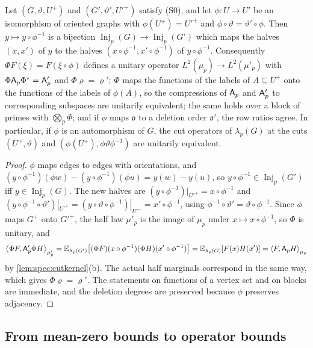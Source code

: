 \begin{lemma}\label{lem:cut-transport}
Let $(G,\vartheta,U^+)$ and $(G',\vartheta',U'^+)$ satisfy \textup{(S0)}, and
let $\phi\colon U\to U'$ be an isomorphism of oriented graphs with
$\phi(U^+)=U'^+$ and $\phi\circ\vartheta=\vartheta'\circ\phi$. Then
$y\mapsto y\circ\phi^{-1}$ is a bijection
$\operatorname{Inj}_p(G)\to\operatorname{Inj}_p(G')$ which maps the halves
$(x,x')$ of $y$ to the halves $(x\circ\phi^{-1},x'\circ\phi^{-1})$ of
$y\circ\phi^{-1}$. Consequently $\Phi F(\xi)=F(\xi\circ\phi)$ defines a
unitary operator $L^2(\mu_p)\to L^2(\mu'_p)$ with $\Phi\mathsf A_p\Phi^*=\mathsf A_p'$ and
$\Phi\varrho=\varrho'$; $\Phi$ maps the functions of the labels of
$A\subseteq U^+$ onto the functions of the labels of $\phi(A)$, so the
compressions of $\mathsf A_p$ and $\mathsf A_p'$ to corresponding subspaces are unitarily
equivalent; the same holds over a block of primes with $\bigotimes_p\Phi$; and
if $\phi$ maps $\mathfrak o$ to a deletion order $\mathfrak o'$, the row ratios
agree. In particular, if $\phi$ is an automorphism of $G$, the cut operators of
$\lambda_p(G)$ at the cuts $(U^+,\vartheta)$ and
$(\phi(U^+),\phi\vartheta\phi^{-1})$ are unitarily equivalent.
\end{lemma}

\begin{proof}
$\phi$ maps edges to edges with orientations, and
$(y\circ\phi^{-1})(\phi w)-(y\circ\phi^{-1})(\phi u)=y(w)-y(u)$, so
$y\circ\phi^{-1}\in\operatorname{Inj}_p(G')$ iff $y\in\operatorname{Inj}_p(G)$.
The new halves are $(y\circ\phi^{-1})|_{U'^+}=x\circ\phi^{-1}$ and
$(y\circ\phi^{-1}\circ\vartheta')|_{U'^+}=(y\circ\vartheta\circ\phi^{-1})|_{U'^+}
=x'\circ\phi^{-1}$, using $\phi^{-1}\circ\vartheta'=\vartheta\circ\phi^{-1}$.
Since $\phi$ maps $G^+$ onto $G'^+$, the half law $\mu'_p$ is the image of
$\mu_p$ under $x\mapsto x\circ\phi^{-1}$, so $\Phi$ is unitary, and
\[
  \left\langle \Phi F,\mathsf A_p'\Phi H\right\rangle_{\mu'_p}=\mathbb E_{\lambda_p(G')}\big[(\Phi F)(x\circ\phi^{-1})
  (\Phi H)(x'\circ\phi^{-1})\big]=\mathbb E_{\lambda_p(G)}[F(x)H(x')]=\left\langle F,\mathsf A_p H\right\rangle_{\mu_p}
\]
by \cref{lem:spec:cutkernel}(b). The actual half marginals correspond in the
same way, which gives $\Phi\varrho=\varrho'$. The statements on functions of a
vertex set and on blocks are immediate, and the deletion degrees are preserved
because $\phi$ preserves adjacency.
\end{proof}

\subsection{From mean-zero bounds to operator bounds}\label{subsec:cuts:blocks}

